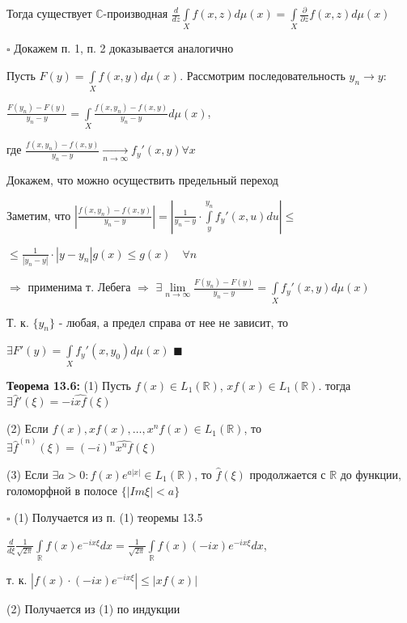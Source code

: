 \documentclass[a4paper]{report}
\begin{document}
Тогда существует  $\mathbb C$-производная $\displaystyle\frac{d}{dz}\displaystyle\int\limits_Xf(x,z)d\mu(x)=\displaystyle\int\limits_X\frac{\partial}{\partial z}f(x,z)d\mu(x)$

\noindent $\square$ Докажем п. 1, п. 2 доказывается аналогично

Пусть $F(y)=\displaystyle\int\limits_Xf(x,y)d\mu(x)$. Рассмотрим последовательность $y_n\to y:$

$\displaystyle\frac{F(y_n)-F(y)}{y_n-y}=\displaystyle\int\limits_X\frac{f(x,y_n)-f(x,y)}{y_n-y}d\mu(x)$, 

где $\displaystyle\frac{f(x,y_n)-f(x,y)}{y_n-y}\xrightarrow[n\to\infty]{}f_y'(x,y)\forall x$

Докажем, что можно осуществить предельный переход

Заметим, что $\left|\displaystyle\frac{f(x,y_n)-f(x,y)}{y_n-y}\right|=\left|\displaystyle\frac{1}{y_n-y}\cdot\displaystyle\int\limits_y^{y_n}f_y'(x,u)du\right|\le$

\noindent $\le\displaystyle\frac{1}{|y_n-y|}\cdot|y-y_n|g(x)\le g(x)\quad\forall n$ 

$\Rightarrow$ применима т. Лебега $\Rightarrow$ $\exists\lim\limits_{n\to\infty}\displaystyle\frac{F(y_n)-F(y)}{y_n-y}=\displaystyle\int\limits_Xf_y'(x,y)d\mu(x)$

Т. к. $\{y_n\}$ - любая, а предел справа от нее не зависит, то 

$\exists F'(y)=\displaystyle\int\limits_Xf_y'(x,y_0)d\mu(x)$ $\blacksquare$
\bigskip

\noindent\textbf{Теорема 13.6:} (1) Пусть $f(x)\in L_1(\mathbb R)$, $xf(x)\in L_1(\mathbb R)$. тогда $\exists\hat f'(\xi)=-i\widehat{xf}(\xi)$

(2) Если $f(x),xf(x),\ldots,x^n f(x)\in L_1(\mathbb R)$, то $\exists\hat f^{(n)}(\xi)=(-i)^n\widehat{x^n f}(\xi)$

(3) Если $\exists a>0\colon f(x)e^{a|x|}\in L_1(\mathbb R)$, то $\hat f(\xi)$ продолжается с $\mathbb R$ до функции, голоморфной в полосе $\{|Im\xi|<a\}$

\noindent $\square$ (1) Получается из п. (1) теоремы 13.5

$\displaystyle\frac{d}{d\xi}\frac{1}{\sqrt{2\pi}}\displaystyle\int\limits_{\mathbb R}f(x)e^{-ix\xi}dx=\frac{1}{\sqrt{2\pi}}\displaystyle\int\limits_{\mathbb R}f(x)(-ix)e^{-ix\xi}dx$, 

т. к. $|f(x)\cdot(-ix)e^{-ix\xi}|\le|xf(x)|$

(2) Получается из (1) по индукции
\end{document}
